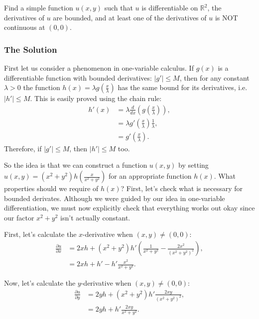 Find a simple function \(u(x,y)\) such that \(u\) is differentiable on \(\mathbb R^2\), the derivatives of \(u\) are bounded, and at least one of the derivatives of \(u\) is NOT continuous at \((0,0)\).

\subsubsection*{The Solution}

First let us consider a phenomenon in one-variable calculus. If \(g(x)\) is a differentiable function with bounded derivatives: \(|g'| \leq M\), then for any constant \(\lambda > 0\) the function
\(h(x) = \lambda g\left(\frac{x}{\lambda}\right)\) has the same bound for its derivatives, i.e. \(|h'| \leq M\). This is easily proved using the chain rule:
\begin{align}
h'(x) & = \lambda \frac{d}{dx} \left( g\left(\frac{x}{\lambda}\right)\right), \\
    & = \lambda g'\left(\frac{x}{\lambda}\right) \frac{1}{\lambda}, \\
    & = g'\left(\frac{x}{\lambda}\right). 
\end{align}
Therefore, if \(|g'| \leq M\), then \(|h'| \leq M\) too. 

So the idea is that we can construct a function \(u(x,y)\) by setting \(u(x,y) = (x^2 + y^2) h\left(\frac{x}{x^2 + y^2}\right)\) for an appropriate function \(h(x)\). What properties should we require
of \(h(x)\)? First, let's check what is necessary for bounded derivates. Although we were guided by our idea in one-variable differentiation, we must now explicitly check that everything works out okay
since our factor \(x^2 + y^2\) isn't actually constant. 

First, let's calculate the \(x\)-derivative when \((x,y) \neq (0, 0)\):
\begin{align}
\frac{\partial u}{\partial x} & = 2x h + (x^2 + y^2) h' \left(\frac{1}{x^2 + y^2} - \frac{2x^2}{(x^2 + y^2)^2}\right), \\
    & = 2xh + h' - h' \frac{x^2}{x^2 + y^2}. 
\end{align}

Now, let's calculate the \(y\)-derivative when \((x,y) \neq (0,0)\):
\begin{align}
\frac{\partial u}{\partial y} & = 2yh + (x^2 + y^2) h' \frac{2xy}{(x^2 + y^2)^2}, \\
    & = 2yh + h'\frac{2xy}{x^2 + y^2}.
\end{align}

